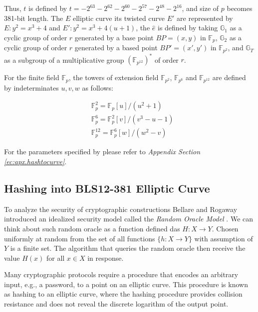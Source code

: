 Thus,  $t$ is defined by $t= -2^63 - 2^62 - 2^60 - 2^57 - 2^48 - 2^16$, and size of $p$ becomes 381-bit length.  The $E$ elliptic curve its twisted curve $E'$ are represented by $E: y^2 = x^3 + 4$ and $E': y^2 = x^3 + 4(u + 1)$, the $\hat{e}$ is defined by taking $\mathbb{G}_1$ as a cyclic group of order $r$ generated by a base point $BP = (x, y)$ in $\mathbb{F}_p$, $\mathbb{G}_2$ as a cyclic group of order $r$ generated by a based point $BP' = (x', y')$ in $ \mathbb{F}_{p^2}$, and $\mathbb{G}_T$ as a subgroup of a multiplicative group $(\mathbb{F}_{p^12})^*$ of order $r$.


 For the finite field $\mathbb{F}_p$, the towers of extension field $\mathbb{F}_{p^2}$, $\mathbb{F}_{p^6}$ and $\mathbb{F}_{p^12}$ are defined by indeterminates $u, v, w$ as follows:

	\begin{align}
	&  \mathbb{F}_p^2 = \mathbb{F}_p[u] / (u^2 + 1)\\
	& \mathbb{F}_p^6 = \mathbb{F}_p^2[v] / (v^3 - u - 1)\\
	&  \mathbb{F}_p^12 = \mathbb{F}_p^6[w] / (w^2 - v)
\end{align}

For the parameters specified by \cite{ecc.pairing.curves.bls} please refer to \textit{Appendix Section \ref{ec:apx.hashtocurve}}.


\subsection{Hashing into BLS12-381 Elliptic Curve}
\label{ssec:hash.to.curve}


To analyze the security of cryptographic constructions Bellare and Rogaway introduced an idealized security model called the \textit{Random Oracle Model} \cite{Bellare1993}. We can think about such random oracle as a function defined das $H: X \rightarrow Y$. Chosen uniformly at random from the set of all functions $\{h: X \rightarrow Y\}$ with assumption of $Y$ is a finite set. The algorithm that queries the random oracle then receive the value $H(x)$ for all $x \in X$ in response. \cite{BF01}


Many cryptographic protocols require a procedure that encodes an
arbitrary input, e.g., a password, to a point on an elliptic curve.
This procedure is known as hashing to an elliptic curve, where the
hashing procedure provides collision resistance and does not reveal
the discrete logarithm of the output point. \cite{ecc.hashing} 

